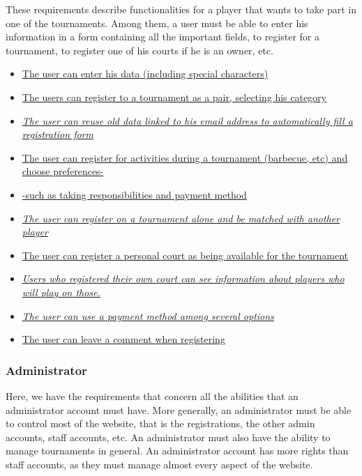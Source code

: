 \documentclass[a4paper, 12pt]{article}
\begin{document}
	These requirements describe functionalities for a player that wants to take part in one of the tournaments. Among them, a user must be able to enter his information in a form containing all the important fields, to register for a tournament, to register one of his courts if he is an owner, etc.\\
	
	\begin{itemize}
		\item \underline{The user can enter his data (including special characters) }
		\item \underline{The users can register to a tournament as a pair, selecting his category}
		\item \underline{\textit{The user can reuse old data linked to his email address to automatically fill a registration form}}
		\item \underline{The user can register for activities during a tournament (barbecue, etc) and choose preferences-} 
		
		\item \underline{-such as taking responsibilities and payment method}
		\item \underline{\textit{The user can register on a tournament alone and be matched with another player}}
		\item \underline{The user can register a personal court as being available for the tournament}
		\item \underline{\textit{Users who registered their own court can see information about players who will play on those.}}
		\item \underline{\textit{The user can use a payment method among several options}}
		\item \underline{The user can leave a comment when registering}
		
	\end{itemize}

\subsubsection*{Administrator}
    Here, we have the requirements that concern all the abilities that an administrator account must have. More generally, an administrator must be able to control most of the website, that is the registrations, the other admin accounts, staff accounts, etc. An administrator must also have the ability to manage tournaments in general. An administrator account has more rights than staff accounts, as they must manage almost every aspect of the website.\\ 
    
\end{document}
